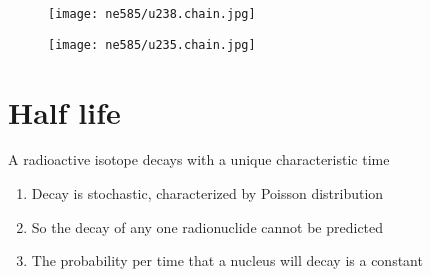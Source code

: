 \documentclass[aspectratio=1610,pdftex,dvipsnames,compress,xcolor={dvipsnames}]{beamer}
\begin{document}
\begin{frame}{}
    \begin{figure}
        \centering
        \texttt{[image: ne585/u238.chain.jpg]}
    \end{figure}
\end{frame}


\begin{frame}{}
    \begin{figure}
        \centering
        \texttt{[image: ne585/u235.chain.jpg]}
    \end{figure}
\end{frame}


\section{Half life}


\addtocounter{framenumber}{-1}
\begin{frame}{A radioactive isotope decays with a unique characteristic time}
    \begin{enumerate}[series=outerlist,topsep=0pt,itemsep=21pt,leftmargin=*,label=(\arabic*)]
        \item[]Decay is stochastic, characterized by Poisson distribution
        \item[]So the decay of any one radionuclide cannot be predicted
        \item[]The probability per time that a nucleus will decay is a constant
    \end{enumerate}
\end{frame}
\end{document}
